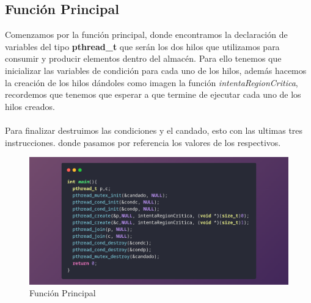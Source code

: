 \documentclass[10pt]{article}
\begin{document}
	\subsection{Función Principal}
	Comenzamos por la función principal, donde encontramos la declaración de variables del tipo \textbf{pthread\_t} que serán los dos hilos que utilizamos para consumir y producir elementos dentro del almacén. Para ello tenemos que inicializar las variables de condición para cada uno de los hilos, además hacemos la creación de los hilos dándoles como imagen la función \emph{intentaRegionCritica}, recordemos que tenemos que esperar a que termine de ejecutar cada uno de los hilos creados. 
	\\\\
	Para finalizar destruimos las condiciones y el candado, esto con las ultimas tres instrucciones. donde pasamos por referencia los valores de los respectivos.  
	\begin{figure}[h!]
		\centering
		\includegraphics[width=\linewidth]{main.png}
		\caption{Función Principal}
		\label{fig:main}
	\end{figure}
\end{document}
